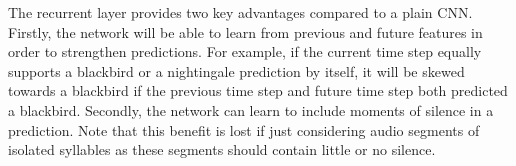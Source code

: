 The recurrent layer provides two key advantages compared to a plain CNN\@.
Firstly, the network will be able to learn from previous and future features in
order to strengthen predictions. For example, if the current time step equally
supports a blackbird or a nightingale prediction by itself, it will be skewed
towards a blackbird if the previous time step and future time step both
predicted a blackbird. Secondly, the network can learn to include moments of
silence in a prediction. Note that this benefit is lost if just considering
audio segments of isolated syllables as these segments should contain little or
no silence.
